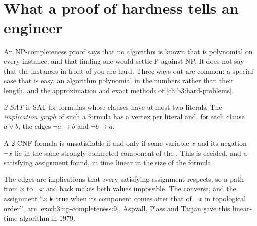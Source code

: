 \section{What a proof of hardness tells an engineer}\label{sec:b3:np-completeness:engineer}

An NP-completeness proof says that no algorithm is known that is polynomial on every instance, and that finding one would settle P against NP. It does not say that the instances in front of you are hard. Three ways out are common: a special case that is easy, an algorithm polynomial in the numbers rather than their length, and the approximation and exact methods of \cref{ch:b3:hard-problems}.

\begin{definition}\label{def:b3:np-completeness:2sat}
\emph{2-SAT} is SAT for formulas whose clauses have at most two literals. The \emph{implication graph} of such a formula has a vertex per literal and, for each clause $a \vee b$, the edges $\neg a \to b$ and $\neg b \to a$.
\end{definition}

\begin{theorem}[2-SAT is in P]\label{thm:b3:np-completeness:2sat}
A 2-CNF formula is unsatisfiable if and only if some variable $x$ and its negation $\neg x$ lie in the same strongly connected component of the . This is decided, and a satisfying assignment found, in time linear in the size of the formula.
\end{theorem}

The edges are implications that every satisfying assignment respects, so a path from $x$ to $\neg x$ and back makes both values impossible. The converse, and the assignment ``$x$ is true when its component comes after that of $\neg x$ in topological order'', are \cref{exo:b3:np-completeness:9}. Aspvall, Plass and Tarjan gave this linear-time algorithm in 1979. %

\label{lst:b3:np-completeness:2sat}

\label{out:b3:np-completeness:2sat}

